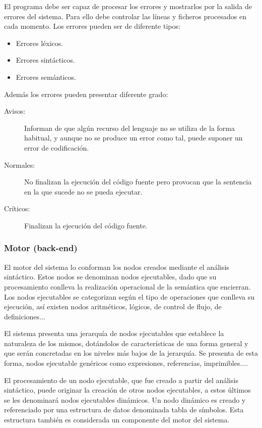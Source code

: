 El programa debe ser capaz de procesar los errores y mostrarlos por la salida de errores del sistema. Para ello debe controlar las líneas y ficheros procesados en cada
momento. Los errores pueden ser de diferente tipos:

\begin{itemize}
\item Errores léxicos.
\item Errores sintácticos.
\item Errores semánticos.
\end{itemize}

Además los errores pueden presentar diferente grado:

\begin{description}
\item [Avisos:] Informan de que algún recurso del lenguaje no se utiliza de la forma habitual, y aunque no se produce un error como tal, puede suponer un error de codificación.
\item [Normales:] No finalizan la ejecución del código fuente pero provocan que la sentencia en la que sucede no se pueda ejecutar.
\item [Críticos:] Finalizan la ejecución del código fuente.
\end{description}

\subsubsection{Motor (back-end)}
El motor del sistema lo conforman los nodos creados mediante el análisis sintáctico. Estos nodos se denominan nodos ejecutables, dado que su procesamiento conlleva la realización operacional
de la semántica que encierran. Los nodos ejecutables se categorizan según el tipo de operaciones que conlleva su ejecución, así existen nodos aritméticos, lógicos, de control de flujo, 
de definiciones... 

El sistema presenta una jerarquía de nodos ejecutables que establece la naturaleza de los mismos, dotándolos de características de una forma general y que serán concretadas en los niveles más
bajos de la jerarquía. Se presenta de esta forma, nodos ejecutable genéricos como expresiones, referencias, imprimibles....

El procesamiento de un nodo ejecutable, que fue creado a partir del análisis sintáctico, puede originar la creación de otros nodos ejecutables, a estos 
últimos se les denominará nodos ejecutables dinámicos. Un nodo dinámico es creado y referenciado por una estructura de datos denominada tabla de símbolos. 
Esta estructura también es considerada un componente del motor del sistema.

